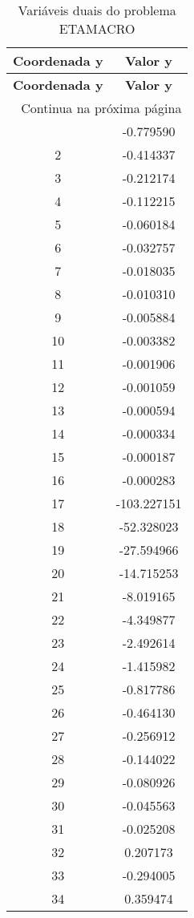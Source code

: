 \documentclass[12pt]{article}
\begin{document}
\begin{longtable}{@{}cc@{}}
\caption{Variáveis duais do problema ETAMACRO} \\
\toprule
\textbf{Coordenada y} & \textbf{Valor y} \\
\midrule
\endfirsthead

\toprule
\textbf{Coordenada y} & \textbf{Valor y} \\
\midrule
\endhead

\midrule \multicolumn{2}{r}{{Continua na próxima página}} \\ \midrule
\endfoot

\bottomrule
\endlastfoot
1 & -0.779590 \\
2 & -0.414337 \\
3 & -0.212174 \\
4 & -0.112215 \\
5 & -0.060184 \\
6 & -0.032757 \\
7 & -0.018035 \\
8 & -0.010310 \\
9 & -0.005884 \\
10 & -0.003382 \\
11 & -0.001906 \\
12 & -0.001059 \\
13 & -0.000594 \\
14 & -0.000334 \\
15 & -0.000187 \\
16 & -0.000283 \\
17 & -103.227151 \\
18 & -52.328023 \\
19 & -27.594966 \\
20 & -14.715253 \\
21 & -8.019165 \\
22 & -4.349877 \\
23 & -2.492614 \\
24 & -1.415982 \\
25 & -0.817786 \\
26 & -0.464130 \\
27 & -0.256912 \\
28 & -0.144022 \\
29 & -0.080926 \\
30 & -0.045563 \\
31 & -0.025208 \\
32 & 0.207173 \\
33 & -0.294005 \\
34 & 0.359474 \\

\end{longtable}
\end{document}
